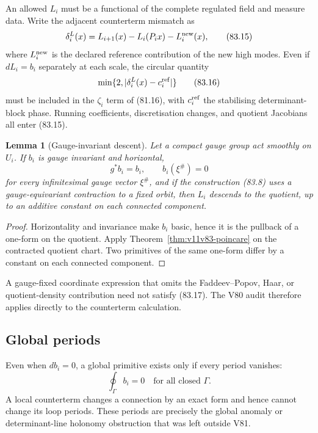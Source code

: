 \documentclass[11pt]{article}
\newtheorem{lemma}[theorem]{Lemma}
\begin{document}
An allowed \(L_i\) must be a functional of the complete regulated
field and measure data.  Write the adjacent counterterm mismatch as
\[
 \delta_i^L(x)
 =L_{i+1}(x)-L_i(P_ix)-L_i^{\rm new}(x),                    \tag{83.15}
\]
where \(L_i^{\rm new}\) is the declared reference contribution of the
new high modes.  Even if \(dL_i=b_i\) separately at each scale, the
circular quantity
\[
                   \min\{2,|\delta_i^L(x)-c_i^{\rm ref}|\}   \tag{83.16}
\]
must be included in the \(\zeta_i\) term of (81.16), with
\(c_i^{\rm ref}\) the stabilising determinant-block phase.
Running coefficients, discretisation changes, and quotient
Jacobians all enter (83.15).

\begin{lemma}[Gauge-invariant descent]
\label{lem:v11v83-descent}
Let a compact gauge group act smoothly on \(U_i\).  If \(b_i\) is
gauge invariant and horizontal,
\[
 g^*b_i=b_i,\qquad b_i(\xi^\#)=0                             \tag{83.17}
\]
for every infinitesimal gauge vector \(\xi^\#\), and if the
construction (83.8) uses a gauge-equivariant contraction to a fixed
orbit, then \(L_i\) descends to the quotient, up to an additive
constant on each connected component.
\end{lemma}

\begin{proof}
Horizontality and invariance make \(b_i\) basic, hence it is the
pullback of a one-form on the quotient.  Apply
Theorem~\ref{thm:v11v83-poincare} on the contracted quotient chart.
Two primitives of the same one-form differ by a constant on each
connected component.
\end{proof}

A gauge-fixed coordinate expression that omits the Faddeev--Popov,
Haar, or quotient-density contribution need not satisfy (83.17).
The V80 audit therefore applies directly to the counterterm
calculation.

\subsection{Global periods}

Even when \(db_i=0\), a global primitive exists only if every period
vanishes:
\[
                               \oint_\Gamma b_i=0
                    \quad\text{for all closed }\Gamma.       \tag{83.18}
\]
A local counterterm changes a connection by an exact form and hence
cannot change its loop periods.  These periods are precisely the
global anomaly or determinant-line holonomy obstruction that was
left outside V81.
\end{document}
